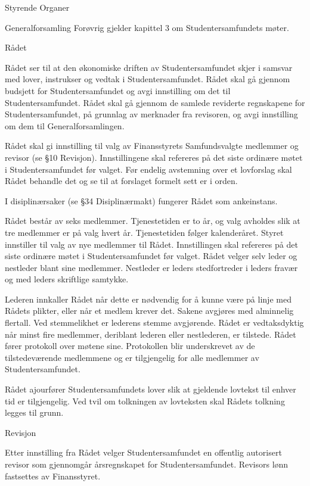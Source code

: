\documentclass[fsbok.tex]{subfiles}
\begin{document}
\begin{lovkapittel}{Styrende Organer}
\begin{lovparagraf}{Generalforsamling}
Forøvrig gjelder kapittel 3 om Studentersamfundets møter.

    \end{lovparagraf}
    
    \begin{lovparagraf}{Rådet}
    
Rådet ser til at den økonomiske driften av Studentersamfundet skjer i samsvar med lover, instrukser og vedtak i
Studentersamfundet. Rådet skal gå gjennom budsjett for Studentersamfundet og avgi innstilling om det til
Studentersamfundet. Rådet skal gå gjennom de samlede reviderte regnskapene for Studentersamfundet, på grunnlag
av merknader fra revisoren, og avgi innstilling om dem til Generalforsamlingen. 

Rådet skal gi innstilling til valg av
Finansstyrets Samfundsvalgte medlemmer og revisor (se §10 Revisjon). Innstillingene skal refereres på det siste
ordinære møtet i Studentersamfundet før valget. Før endelig avstemning over et lovforslag skal Rådet behandle det og
se til at forslaget formelt sett er i orden. 

I disiplinærsaker (se §34 Disiplinærmakt) fungerer Rådet som ankeinstans.

Rådet består av seks medlemmer. Tjenestetiden er to år, og valg avholdes slik at tre medlemmer er på valg hvert år.
Tjenestetiden følger kalenderåret. Styret innstiller til valg av nye medlemmer til Rådet. Innstillingen skal refereres på
det siste ordinære møtet i Studentersamfundet før valget. Rådet velger selv leder og nestleder blant sine medlemmer.
Nestleder er leders stedfortreder i leders fravær og med leders skriftlige samtykke.

Lederen innkaller Rådet når dette er nødvendig for å kunne være på linje med Rådets plikter, eller når et medlem
krever det. Sakene avgjøres med alminnelig flertall. Ved stemmelikhet er lederens stemme avgjørende. Rådet er
vedtaksdyktig når minst fire medlemmer, deriblant lederen eller nestlederen, er tilstede. Rådet fører protokoll over
møtene sine. Protokollen blir underskrevet av de tilstedeværende medlemmene og er tilgjengelig for alle medlemmer
av Studentersamfundet.

Rådet ajourfører Studentersamfundets lover slik at gjeldende lovtekst til enhver tid er tilgjengelig. Ved tvil om
tolkningen av lovteksten skal Rådets tolkning legges til grunn.

  \end{lovparagraf}
  
  \begin{lovparagraf}{Revisjon}
  
Etter innstilling fra Rådet velger Studentersamfundet en offentlig autorisert revisor som gjennomgår årsregnskapet for
Studentersamfundet. Revisors lønn fastsettes av Finansstyret.

  \end{lovparagraf}
  
\end{lovkapittel}
\end{document}
